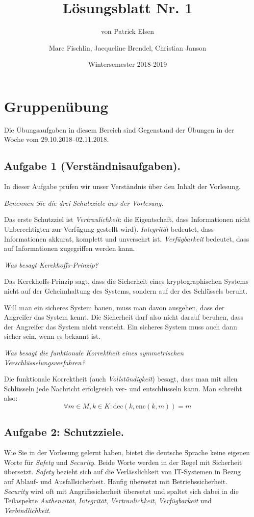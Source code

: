 \documentclass[
  ngerman,
  DIV=12
]{scrartcl}
\title{Lösungsblatt Nr. 1}
\date{Wintersemester 2018-2019}
\author{Marc Fischlin, Jacqueline Brendel, Christian Janson}
\subtitle{von Patrick Elsen}
\begin{document}
\maketitle

\section*{Gruppenübung}
Die Übungsaufgaben in diesem Bereich sind Gegenstand der Übungen in der Woche vom 29.10.2018–02.11.2018.

\subsection*{Aufgabe 1 (Verständnisaufgaben).} 
In dieser Aufgabe prüfen wir unser Verständnis über den Inhalt der Vorlesung.

\medskip\noindent
\emph{Benennen Sie die drei Schutzziele aus der Vorlesung.}

\medskip\noindent
Das erste Schutzziel ist \emph{Vertraulichkeit}: die Eigentschaft, dass Informationen nicht Unberechtigten zur Verfügung gestellt wird). \emph{Integrität} bedeutet, dass Informationen akkurat, komplett und unversehrt ist. \emph{Verfügbarkeit} bedeutet, dass auf Informationen zugegriffen werden kann.

\bigskip\noindent
\emph{Was besagt Kerckhoffs-Prinzip?}

\medskip\noindent
Das Kerckhoffs-Prinzip sagt, dass die Sicherheit eines kryptographischen Systems nicht auf der Geheimhaltung des Systems, sondern auf der des Schlüssels beruht. 

Will man ein sicheres System bauen, muss man davon ausgehen, dass der Angreifer das System kennt. Die Sicherheit darf also nicht darauf beruhen, dass der Angreifer das System nicht versteht. Ein sicheres System muss auch dann sicher sein, wenn es bekannt ist. 

\bigskip\noindent
\emph{Was besagt die funktionale Korrektheit eines symmetrischen Verschlüsselungsverfahren?}

\medskip\noindent
Die funktionale Korrektheit (auch \emph{Vollständigkeit}) besagt, dass man mit allen Schlüsseln jede Nachricht erfolgreich ver- und entschlüsseln kann. Man schreibt also:
\begin{equation*}
\forall m \in M, k \in K: \textrm{dec}(k, \textrm{enc}(k, m)) = m  
\end{equation*}


\subsection*{Aufgabe 2: Schutzziele.}
Wie Sie in der Vorlesung gelernt haben, bietet die deutsche Sprache keine eigenen Worte für \emph{Safety} und \emph{Security}. Beide Worte werden in der Regel mit Sicherheit übersetzt.
\emph{Safety} bezieht sich auf die Verlässlichkeit von IT-Systemen in Bezug auf Ablauf- und Ausfallsicherheit. Häufig übersetzt mit Betriebssicherheit.
\emph{Security} wird oft mit Angriffssicherheit übersetzt und spaltet sich dabei in die Teilaspekte \emph{Authenzität}, \emph{Integrität}, \emph{Vertraulichkeit}, \emph{Verfügbarkeit} und \emph{Verbindlichkeit}. 
\end{document}
